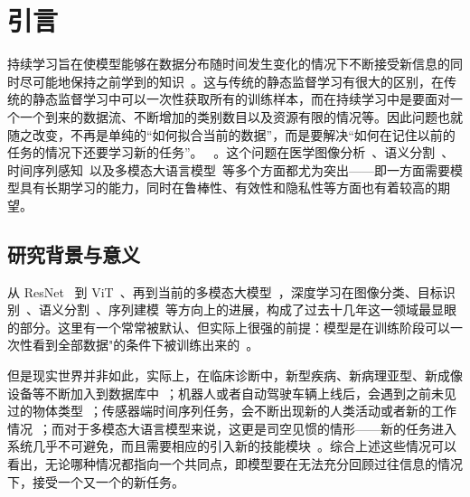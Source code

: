 \chapter{引言}

持续学习旨在使模型能够在数据分布随时间发生变化的情况下不断接受新信息的同时尽可能地保持之前学到的知识~\citep{wang2024survey,zhou2024class,zhou2023cil_survey_zh,wang2025llm_cl_zh,leo2024survey}。这与传统的静态监督学习有很大的区别，在传统的静态监督学习中可以一次性获取所有的训练样本，而在持续学习中是要面对一个一个到来的数据流、不断增加的类别数目以及资源有限的情况等。因此问题也就随之改变，不再是单纯的“如何拟合当前的数据”，而是要解决“如何在记住以前的任务的情况下还要学习新的任务”。
~\citep{wang2024survey,mccloskey1989catastrophic,goodfellow2013catastrophic}。这个问题在医学图像分析~\citep{yang2023medmnist,derakhshani2022lifelonger}、语义分割~\citep{cermelli2020mib,douillard2021plop}、时间序列感知~\citep{qiao2024tscil,huo2025continue}以及多模态大语言模型~\citep{zhai2023investigating,wu2024continual,shi2024continual,guo2025mcitlib}等多个方面都尤为突出——即一方面需要模型具有长期学习的能力，同时在鲁棒性、有效性和隐私性等方面也有着较高的期望。

\section{研究背景与意义}

从 ResNet~\citep{he2016resnet} 到 ViT~\citep{dosovitskiy2020image}、再到当前的多模态大模型~\citep{liu2023llava,chen2024internvl}，深度学习在图像分类、目标识别~\citep{radford2021learning}、语义分割~\citep{chen2017deeplabv3,wang2019dgcnn}、序列建模~\citep{qiao2024tscil}等方向上的进展，构成了过去十几年这一领域最显眼的部分。这里有一个常常被默认、但实际上很强的前提：模型是在训练阶段可以一次性看到全部数据"的条件下被训练出来的~\citep{wang2024survey,zhou2024class}。

但是现实世界并非如此，实际上，在临床诊断中，新型疾病、新病理亚型、新成像设备等不断加入到数据库中~\citep{yang2023medmnist,derakhshani2022lifelonger,sun2023few}；机器人或者自动驾驶车辆上线后，会遇到之前未见过的物体类型~\citep{rebuffi2017icarl,hou2019learning,zhou2023cil_survey_zh}；传感器端时间序列任务，会不断出现新的人类活动或者新的工作情况~\citep{qiao2024tscil,huo2025continue}；而对于多模态大语言模型来说，这更是司空见惯的情形——新的任务进入系统几乎不可避免，而且需要相应的引入新的技能模块~\citep{zhai2023investigating,wu2024continual,shi2024continual,zhao2025mllm,guo2025mcitlib}。综合上述这些情况可以看出，无论哪种情况都指向一个共同点，即模型要在无法充分回顾过往信息的情况下，接受一个又一个的新任务。

